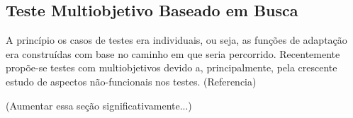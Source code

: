 \subsection{Teste Multiobjetivo Baseado em Busca}

A princípio os casos de testes era individuais, ou seja, as funções de
adaptação era construídas com base no caminho em que seria percorrido.
Recentemente propõe-se testes com multiobjetivos devido a, principalmente, pela
crescente estudo de aspectos não-funcionais nos testes. (Referencia)

(Aumentar essa seção significativamente...)












